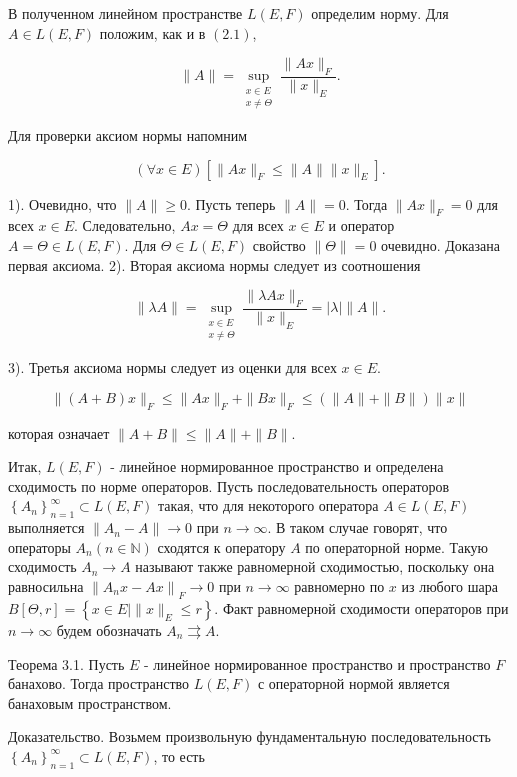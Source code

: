 \documentclass[a4paper, 12pt]{extarticle}
\begin{document}
В полученном линейном пространстве $L(E, F)$ определим норму. Для $A \in L(E, F)$ положим, как и в $(2.1)$,

$$
	\|A\|=\sup _{\substack{x \in E \\ x \neq \Theta}} \frac{\|A x\|_{F}}{\|x\|_{E}} .
$$

Для проверки аксиом нормы напомним

$$
	(\forall x \in E)\left[\|A x\|_{F} \leq\|A\|\|x\|_{E}\right] .
$$

1). Очевидно, что $\|A\| \geq 0$. Пусть теперь $\|A\|=0$. Тогда $\|A x\|_{F}=0$ для всех $x \in E$. Следовательно, $A x=\Theta$ для всех $x \in E$ и оператор $A=\Theta \in L(E, F)$. Для $\Theta \in L(E, F)$ свойство $\|\Theta\|=0$ очевидно. Доказана первая аксиома. 2). Вторая аксиома нормы следует из соотношения

$$
	\|\lambda A\|=\sup _{\substack{x \in E \\ x \neq \Theta}} \frac{\|\lambda A x\|_{F}}{\|x\|_{E}}=|\lambda|\|A\| .
$$

3). Третья аксиома нормы следует из оценки для всех $x \in E$.

$$
	\|(A+B) x\|_{F} \leq\|A x\|_{F}+\|B x\|_{F} \leq(\|A\|+\|B\|)\|x\|
$$

которая означает $\|A+B\| \leq\|A\|+\|B\|$.

Итак, $L(E, F)$ - линейное нормированное пространство и определена сходимость по норме операторов. Пусть последовательность операторов $\left\{A_{n}\right\}_{n=1}^{\infty} \subset L(E, F)$ такая, что для некоторого оператора $A \in L(E, F)$ выполняется $\left\|A_{n}-A\right\| \rightarrow 0$ при $n \rightarrow \infty$. В таком случае говорят, что операторы $A_{n}(n \in \mathbb{N})$ сходятся к оператору $A$ по операторной норме. Такую сходимость $A_{n} \rightarrow A$ называют также равномерной сходимостью, поскольку она равносильна $\left\|A_{n} x-A x\right\|_{F} \rightarrow 0$ при $n \rightarrow \infty$ равномерно по $x$ из любого шара $B[\Theta, r]=\left\{x \in E \mid\|x\|_{E} \leq r\right\}$. Факт равномерной сходимости операторов при $n \rightarrow \infty$ будем обозначать $A_{n} \rightrightarrows A$.

Теорема 3.1. Пусть $E$ - линейное нормированное пространство и пространство $F$ банахово. Тогда пространство $L(E, F)$ с операторной нормой является банаховым пространством.

Доказательство. Возьмем произвольную фундаментальную последовательность $\left\{A_{n}\right\}_{n=1}^{\infty} \subset L(E, F)$, то есть
\end{document}
